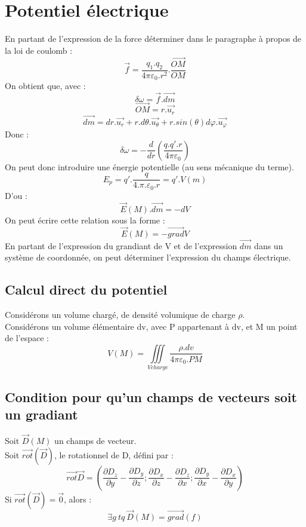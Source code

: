 \section{Potentiel électrique}
\begin{de}
En partant de l'expression de la force déterminer dans le paragraphe à propos de la loi de coulomb : 
$$\overrightarrow{f} = \dfrac{q_1.q_2}{4\pi\varepsilon_0.r^2}.\dfrac{\overrightarrow{OM}}{OM}$$
On obtient que, avec : 
$$\delta \omega = \overrightarrow{f}.\overrightarrow{dm}$$
$$\overrightarrow{OM} = r.\overrightarrow{u_r}$$
$$\overrightarrow{dm}=dr.\overrightarrow{u_r}+r.d\theta.\overrightarrow{u_{\theta}}+r.sin(\theta)d\varphi.\overrightarrow{u_{\varphi}}$$
Donc : 
$$\delta \omega = -\dfrac{d}{dr}(\dfrac{q.q'.r}{4\pi\varepsilon_0})$$
On peut donc introduire une énergie potentielle (au sens mécanique du terme).
$$E_p = q'.\dfrac{q}{4.\pi.\varepsilon_0.r} = q'.V(m)$$
D'ou :
$$\overrightarrow{E}(M).\overrightarrow{dm} = -dV$$
On peut écrire cette relation sous la forme : 
$$\overrightarrow{E}(M) = -\overrightarrow{grad}V$$
En partant de l'expression du grandiant de V et de l'expression $\overrightarrow{dm}$ dans un système de coordonnée, on peut déterminer l'expression du champs électrique.
\end{de}
\subsection{Calcul direct du potentiel}
\begin{de}
Considérons un volume chargé, de densité volumique de charge $\rho$.\\
Considérons un volume élémentaire dv, avec P appartenant à dv, et M un point de l'espace :
$$V(M) = \underset{V charge}\iiint \dfrac{\rho.dv}{4\pi\varepsilon_0.PM}$$
\end{de}
\subsection{Condition pour qu'un champs de vecteurs soit un gradiant}
Soit $\overrightarrow{D}(M)$ un champs de vecteur.\\
Soit $\overrightarrow{rot}(\overrightarrow{D})$, le rotationnel de D, défini par : 
$$\overrightarrow{rot}\overrightarrow{D} = (\dfrac{\partial D_z}{\partial y}-\dfrac{\partial D_y}{\partial z};\dfrac{\partial D_x}{\partial z}-\dfrac{\partial D_z}{\partial x};\dfrac{\partial D_y}{\partial x}-\dfrac{\partial D_x}{\partial y})$$
Si $\overrightarrow{rot}(\overrightarrow{D}) = \overrightarrow{0}$, alors :
$$\exists g~ tq~ \overrightarrow{D}(M) = \overrightarrow{grad}(f)$$
